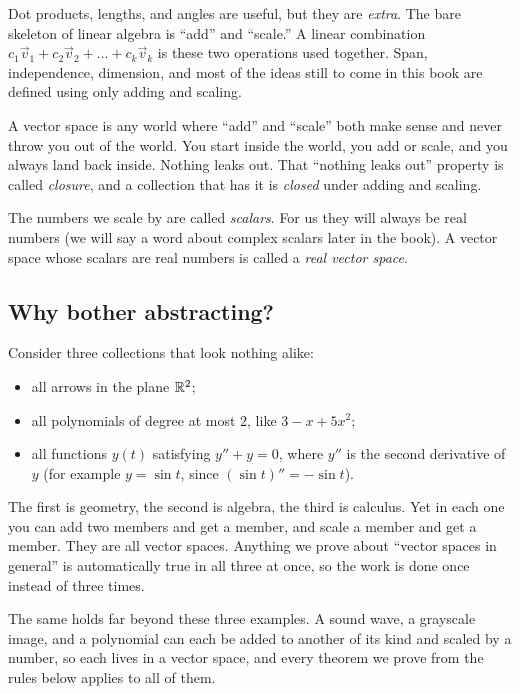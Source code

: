Dot products, lengths, and angles are useful, but they are \emph{extra}. The bare
skeleton of linear algebra is ``add'' and ``scale.'' A linear combination
$c_1\vec{v}_1 + c_2\vec{v}_2 + \dots + c_k\vec{v}_k$ is these two operations
used together. Span, independence, dimension, and most of the ideas still to come in
this book are defined using only adding and scaling.

\begin{intuitionbox}
A vector space is any world where ``add'' and ``scale'' both make sense and never throw
you out of the world. You start inside the world, you add or scale, and you always land
back inside. Nothing leaks out. That ``nothing leaks out'' property is called
\emph{closure}, and a collection that has it is \emph{closed} under adding and scaling.
\end{intuitionbox}

The numbers we scale by are called \emph{scalars}. For us they will always be real
numbers (we will say a word about complex scalars later in the book). A vector space whose
scalars are real numbers is called a \emph{real vector space}.

\subsection{Why bother abstracting?}

Consider three collections that look nothing alike:

\begin{itemize}
  \item all arrows in the plane $\mathbb{R}^2$;
  \item all polynomials of degree at most $2$, like $3 - x + 5x^2$;
  \item all functions $y(t)$ satisfying $y'' + y = 0$, where $y''$ is the second
  derivative of $y$ (for example $y = \sin t$, since $(\sin t)'' = -\sin t$).
\end{itemize}

The first is geometry, the second is algebra, the third is calculus. Yet in each one you
can add two members and get a member, and scale a member and get a member. They are all
vector spaces. Anything we prove about ``vector spaces in general'' is automatically true
in all three at once, so the work is done once instead of three times.

\begin{aestheticbox}
The same holds far beyond these three examples. A sound wave, a
grayscale image, and a polynomial can each be added to another of its kind and scaled by
a number, so each lives in a vector space, and every theorem we prove from the rules below
applies to all of them.
\end{aestheticbox}

